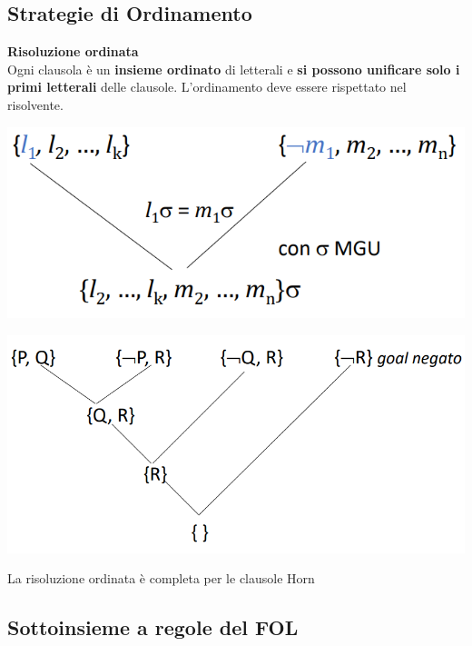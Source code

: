 \documentclass[10pt]{book}
\begin{document}
\subsection{Strategie di Ordinamento}
\begin{list}{}{}
	\item \textbf{Risoluzione ordinata}\\
	Ogni clausola è un \textbf{insieme ordinato} di letterali e \textbf{si possono unificare solo i primi letterali} delle clausole. L'ordinamento deve essere rispettato nel risolvente.
	\begin{multicols}{2}
	\begin{center}
		\includegraphics[scale=0.5]{risord.png}
	\end{center}
	\begin{center}
		\includegraphics[scale=0.4]{risordes.png}
	\end{center}
	\end{multicols}
	La risoluzione ordinata è completa per le clausole Horn
\end{list}
\subsection{Sottoinsieme a regole del FOL}
\end{document}
